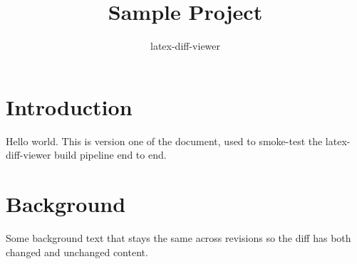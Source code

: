 \documentclass{article}
\title{Sample Project}
\author{latex-diff-viewer}
\begin{document}
\maketitle

\section{Introduction}
Hello world. This is version one of the document, used to smoke-test the
latex-diff-viewer build pipeline end to end.

\section{Background}
Some background text that stays the same across revisions so the diff has both
changed and unchanged content.

\end{document}
